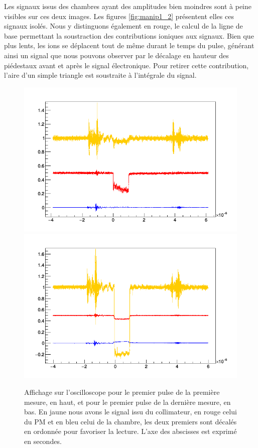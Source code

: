 \documentclass[a4paper,11pt]{article}
\begin{document}
Les signaux issus des chambres ayant des amplitudes bien moindres sont à peine visibles sur ces deux images.
Les figures \ref{fig:manip1_2} présentent elles ces signaux isolés.
Nous y distinguons également en rouge, le calcul de la ligne de base permettant la soustraction des contributions ioniques aux signaux.
Bien que plus lents, les ions se déplacent tout de même durant le temps du pulse, générant ainsi un signal que nous pouvons observer par le décalage en hauteur des piédestaux avant et après le signal électronique.
Pour retirer cette contribution, l'aire d'un simple triangle est soustraite à l'intégrale du signal. 
\begin{figure}[h]
\begin{center}
\includegraphics[width=\linewidth]{manip1_1.png} 
\includegraphics[width=\linewidth]{manip12_2.png} 
\caption{\label{fig:manip1_1}\footnotesize{Affichage sur l'oscilloscope pour le premier pulse de la première mesure, en haut, et pour le premier pulse de la dernière mesure, en bas. En jaune nous avons le signal issu du collimateur, en rouge celui du PM et en bleu celui de la chambre, les deux premiers sont décalés en ordonnée pour favoriser la lecture. L'axe des abscisses est exprimé en secondes.}}
\end{center}
\end{figure}
\end{document}
